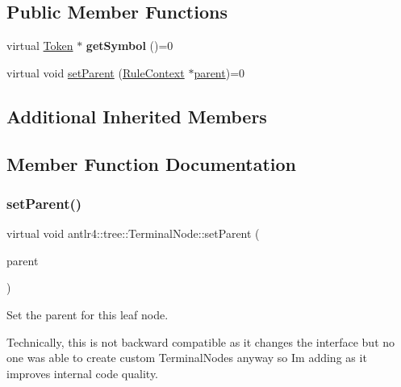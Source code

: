 \subsection*{Public Member Functions}
\begin{DoxyCompactItemize}
\item 
\mbox{\label{classantlr4_1_1tree_1_1TerminalNode_a05b5c99cbcc8bf436c693979a312e879}} 
virtual \hyperlink{classantlr4_1_1Token}{Token} $\ast$ {\bfseries get\+Symbol} ()=0
\item 
virtual void \hyperlink{classantlr4_1_1tree_1_1TerminalNode_ae3a053a21cb472c8198eb831f8757a95}{set\+Parent} (\hyperlink{classantlr4_1_1RuleContext}{Rule\+Context} $\ast$\hyperlink{classantlr4_1_1tree_1_1ParseTree_a83402632670316b68280c04e6be70d50}{parent})=0
\end{DoxyCompactItemize}
\subsection*{Additional Inherited Members}


\subsection{Member Function Documentation}
\mbox{\label{classantlr4_1_1tree_1_1TerminalNode_ae3a053a21cb472c8198eb831f8757a95}} 
\subsubsection{\texorpdfstring{set\+Parent()}{setParent()}}
{\footnotesize\ttfamily virtual void antlr4\+::tree\+::\+Terminal\+Node\+::set\+Parent (\begin{DoxyParamCaption}\item[{\hyperlink{classantlr4_1_1RuleContext}{Rule\+Context} $\ast$}]{parent }\end{DoxyParamCaption})\hspace{0.3cm}{\ttfamily [pure virtual]}}

Set the parent for this leaf node.

Technically, this is not backward compatible as it changes the interface but no one was able to create custom Terminal\+Nodes anyway so I\textquotesingle{}m adding as it improves internal code quality.

